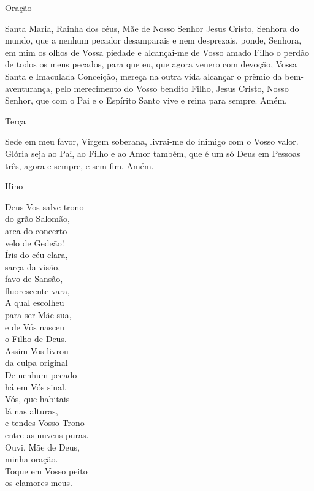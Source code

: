 \begin{center}
    \textcolor{VioletRed3}{Oração}
\end{center}
\begin{flushleft}
    Santa Maria, Rainha dos céus, Mãe de Nosso Senhor Jesus Cristo, Senhora do mundo, que a nenhum pecador desamparais e nem desprezais, ponde, Senhora, em mim os olhos de Vossa piedade e alcançai-me de Vosso amado Filho o perdão de todos os meus pecados, para que eu, que agora venero com devoção, Vossa Santa e Imaculada Conceição, mereça na outra vida alcançar o prêmio da bem-aventurança, pelo merecimento do Vosso bendito Filho, Jesus Cristo, Nosso Senhor, que com o Pai e o Espírito Santo vive e reina para sempre. Amém.
\end{flushleft}
\begin{center}
    Terça
\end{center}
\begin{flushleft}
    Sede em meu favor, Virgem soberana, livrai-me do inimigo com o Vosso valor. Glória seja ao Pai, ao Filho e ao Amor também, que é um só Deus em Pessoas três, agora e sempre, e sem fim. Amém.
\end{flushleft}
\begin{center}
    \textcolor{VioletRed3}{Hino}
\end{center}
\begin{multicols}{2}\setlength{\parindent}{0pt}
    Deus Vos salve trono \\
    do grão Salomão, \\
    arca do concerto \\
    velo de Gedeão!
    \vspace{.2cm} \\
    Íris do céu clara, \\
    sarça da visão, \\
    favo de Sansão, \\
    fluorescente vara,
    \vspace{.2cm} \\
    A qual escolheu \\
    para ser Mãe sua, \\
    e de Vós nasceu \\
    o Filho de Deus.
    \vspace{.2cm} \\
    Assim Vos livrou \\
    da culpa original \\
    De nenhum pecado \\
    há em Vós sinal.
    \vspace{.2cm} \\
    Vós, que habitais \\
    lá nas alturas, \\
    e tendes Vosso Trono \\
    entre as nuvens puras.
    \vspace{.2cm} \\
    Ouvi, Mãe de Deus, \\
    minha oração. \\
    Toque em Vosso peito \\
    os clamores meus.
\end{multicols}
